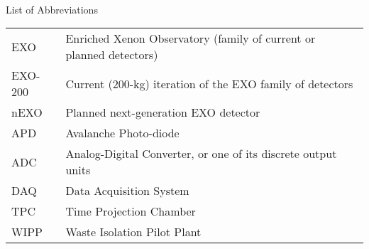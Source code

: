 
\renewcommand{\baselinestretch}{1}
\small\normalsize
\hbox{\ }

\vspace{-4em}

\begin{center}
\large{List of Abbreviations}
\end{center} 

\vspace{3pt}

\begin{tabular}{ll}
EXO & Enriched Xenon Observatory (family of current or planned detectors) \\
EXO-200 & Current (200-kg) iteration of the EXO family of detectors \\
nEXO & Planned next-generation EXO detector \\
APD & Avalanche Photo-diode \\
ADC & Analog-Digital Converter, or one of its discrete output units \\
DAQ & Data Acquisition System \\
TPC & Time Projection Chamber \\
WIPP & Waste Isolation Pilot Plant \\
\end{tabular}

